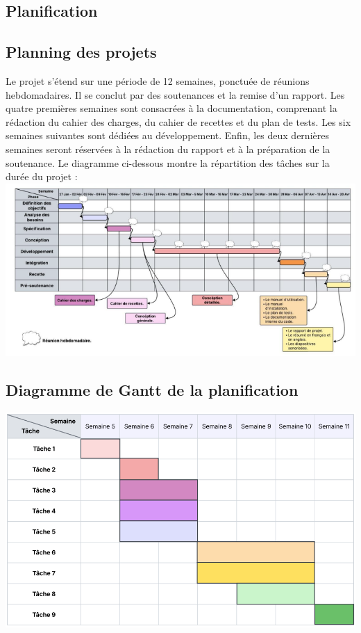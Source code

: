 \documentclass{conception_detaillee}
\begin{document}
\begin{itemize}[label=\textbullet]
\section{Planification}
\subsection{Planning des projets}
Le projet s’étend sur une période de 12 semaines, ponctuée de réunions
hebdomadaires. Il se conclut par des soutenances et la remise d’un rapport. Les
quatre premières semaines sont consacrées à la documentation, comprenant la
rédaction du cahier des charges, du cahier de recettes et du plan de tests. Les
six semaines suivantes sont dédiées au développement. Enfin, les deux
dernières semaines seront réservées à la rédaction du rapport et à la
préparation de la soutenance.
Le diagramme ci-dessous montre la répartition des tâches sur la durée du
projet :\\
\noindent\includegraphics{images/gantt.png}
\subsection{Diagramme de Gantt de la planification}
\noindent\includegraphics[width=0.8\paperwidth]{images/gantt2.png}

\end{itemize}
\end{document}
